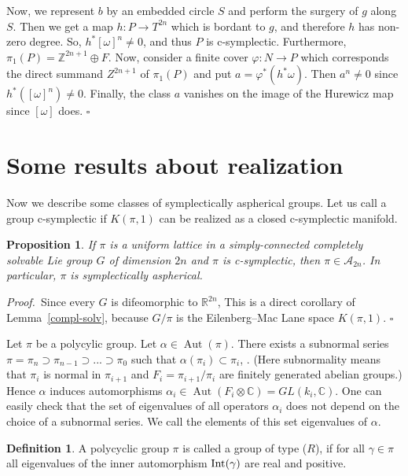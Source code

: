 \documentclass[12pt, twoside]{amsart}
\theoremstyle{plain}
\newtheorem{prop}[theorem]{Proposition}
\theoremstyle{definition}
\newtheorem{df}[theorem]{Definition}
\numberwithin{equation}{section}
\def\CC{\mathbb C}
\def\RR{\mathbb R}
\def\ZZ{\mathbb Z}
\def\Aut{\operatorname {Aut}}
\def\hqed{\hfill\hfill$\square$}
\def\AAA{{\mathcal A}}
\def\gf{\varphi}
\def\CC{\mathbb C}
\def\RR{\mathbb R}
\def\ZZ{\mathbb Z}
\def\m{\medskip}
\def\p{{\it Proof.\ }}
\begin{document}
\m
Now, we represent $b$ by an embedded circle $S$ and perform the surgery of $g$ 
along $S$. Then we get a map $h: P \to T^{2n}$ which is bordant to $g$, and 
therefore $h$ has non-zero degree.  So, $h^*[\omega]^n\ne 0$, and thus $P$ is 
c-symplectic. Furthermore, $\pi_1(P)=\ZZ^{2n+1} \oplus F$. Now, consider a 
finite cover $\gf: N \to P$ which corresponds the direct summand $Z^{2n+1}$ of 
$\pi_1(P)$ and put $a=\gf^*(h^*\omega)$. Then $a^n\ne 0$ since 
$h^*([\omega]^n)\ne 0$. Finally, the class $a$ vanishes on the image of the 
Hurewicz map since $[\omega]$ does.
\hqed


\section{Some results about realization} 
 
Now we describe some classes of symplectically aspherical groups. Let us call 
a group c-symplectic if $K(\pi, 1)$ can be realized as a closed c-symplectic 
manifold. 

\begin{prop}\label{c-sympl} 
If $\pi$ is a uniform lattice in a simply-connected completely solvable Lie 
group $G$ of dimension $2n$ and $\pi$ is 
c-symplectic, then $\pi \in
\AAA_{2n}$. In particular, $\pi$ is symplectically aspherical. 
\end{prop}

\p Since every $G$ is difeomorphic to $\RR^{2n}$, This is a direct corollary 
of Lemma~\ref{compl-solv}, because $G/\pi$ is the Eilenberg--Mac Lane space 
$K(\pi,1)$.
\hqed

\m Let $\pi$ be a polycylic group. Let $\alpha\in\Aut(\pi)$. There exists a
subnormal series $\pi=\pi_n\supset \pi_{n-1}\supset ... \supset \pi_0$ such
that $\alpha(\pi_i)\subset\pi_i$, \cite{Gb}. (Here subnormality means that
$\pi_i$ is normal in $\pi_{i+1}$ and $F_i=\pi_{i+1}/\pi_i$ are finitely
generated abelian groups.) Hence $\alpha$ induces automorphisms $\alpha_i\in
\Aut(F_i \otimes\CC)=GL(k_i,\CC)$. One can easily check that the set of
eigenvalues of all operators $\alpha_i$ does not depend on the choice of a
subnormal series. We call the elements of this set eigenvalues of $\alpha$. 

\begin{df} A polycyclic group $\pi$ is called a group of type
($R$), if for all $\gamma\in\pi$ all eigenvalues of the inner automorphism 
$\rm{Int}(\gamma)$ are real and positive. 
\end{df}
\end{document}
